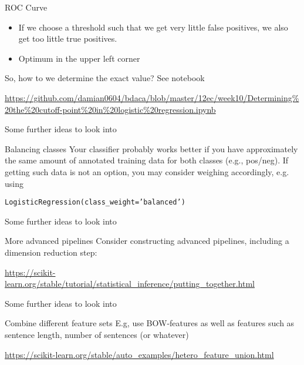\begin{frame}{ROC Curve}
\begin{itemize}
	\item If we choose a threshold such that we get very little false positives, we also get too little true positives.
	\item Optimum in the upper left corner
\end{itemize}

\end{frame}


\begin{frame}{So, how to we determine the exact value? }
See notebook

\url{https://github.com/damian0604/bdaca/blob/master/12ec/week10/Determining\%20the\%20cutoff-point\%20in\%20logistic\%20regression.ipynb}
\end{frame}









\begin{frame}{Some further ideas to look into}

\begin{block}{Balancing classes}
Your classifier probably works better if you have approximately the same amount of annotated training data for both classes (e.g., pos/neg). If getting such data is not an option, you may consider weighing accordingly, e.g. using

\texttt{LogisticRegression(class\_weight='balanced')}
\end{block}

\end{frame}

\begin{frame}{Some further ideas to look into}

\begin{block}{More advanced pipelines}
	Consider constructing advanced pipelines, including a dimension reduction step: 
	
	
	\url{https://scikit-learn.org/stable/tutorial/statistical\_inference/putting\_together.html}
\end{block}

\end{frame}



\begin{frame}{Some further ideas to look into}
\begin{block}{Combine different feature sets}
  E.g, use BOW-features as well as features such as sentence length, number of sentences (or whatever)
  
	\url{
		https://scikit-learn.org/stable/auto\_examples/hetero\_feature\_union.html}
\end{block}



\end{frame}

